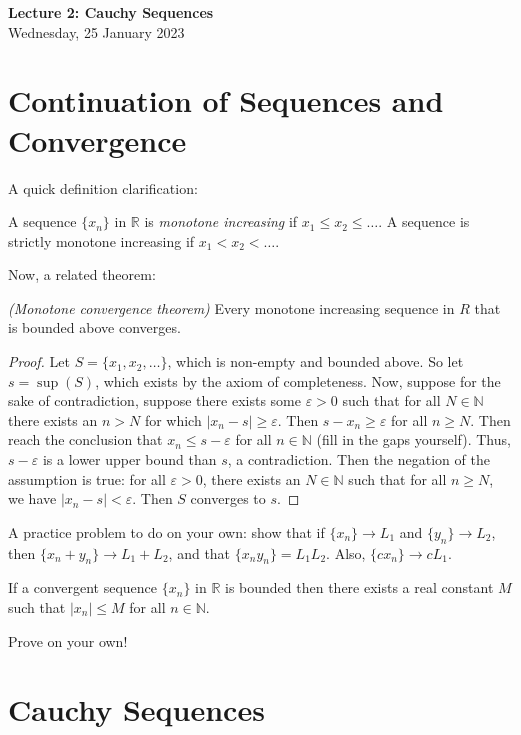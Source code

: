 \documentclass[11pt]{article}
\theoremstyle{definition}
\newcommand{\R}{\mathbb{R}}                      %
\newcommand{\N}{\mathbb{N}}
\begin{document}
\thispagestyle{empty}

\begin{center}
{\LARGE \bf Lecture 2: Cauchy Sequences}\\
{\large Wednesday, 25 January 2023}\\

\end{center}
\section{Continuation of Sequences and Convergence}
A quick definition clarification:

 A sequence $\{x_n\}$ in $\R$ is \textit{monotone increasing} if $x_1\leq x_2\leq\dots$. A sequence is strictly monotone increasing if $x_1<x_2<\dots$.

Now, a related theorem:

\prop \textit{(Monotone convergence theorem)} Every monotone increasing sequence in $R$ that is bounded above converges.

\begin{proof}
    Let $S=\{x_1,x_2,\dots\}$, which is non-empty and bounded above. So let $s=\sup(S)$, which exists by the axiom of completeness. Now, suppose for the sake of contradiction, suppose there exists some $\varepsilon >0$ such that for all $N\in \N$ there exists an $n>N$ for which $|x_n-s|\geq \varepsilon$. Then  $s-x_n\geq \varepsilon$ for all $n\geq N$. Then reach the conclusion that $x_n\leq s-\varepsilon$ for all $n\in\N$ (fill in the gaps yourself). Thus, $s-\varepsilon$ is a lower upper bound than $s$, a contradiction. Then the negation of the assumption is true: for all $\varepsilon>0$, there exists an $N\in \N$ such that for all $n\geq N$, we have $|x_n-s|<\varepsilon$. Then $S$ converges to $s$.
\end{proof}

A practice problem to do on your own: show that if $\{x_n\}\to L_1$ and $\{y_n\}\to L_2$, then $\{x_n+y_n\}\to L_1+L_2$, and that $\{x_ny_n\}=L_1L_2$. Also, $\{cx_n\}\to cL_1$.

\prop If a convergent sequence $\{x_n\}$ in $\R$ is bounded then there exists a real constant $M$ such that $|x_n|\leq M$ for all $n\in\N$.

Prove on your own!

\section{Cauchy Sequences}
\end{document}
